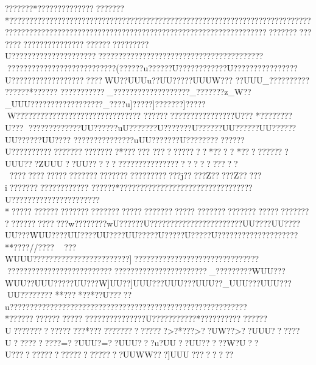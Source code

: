 {{{{{{{{{{{{{{{{{{{{{{{{{{{{{{{{{{{{{{{{{{{{{{{{{{{{{{{{{{{{{{{{{{{{{{{{{{{{{{{{{{{{{{{{{{{{{{{{{{{{{{{{{{{{{{{{{{{{{{{{{{{{{{{{{{{{{{{{{{{{{{{{{{{{{{{{{{{{{{{{{{{{{{{{{{{{{{{{{{{{{{{{{{{{{{{{{{{{{{{{{{{{{{{{{{{{{{{{{{{{{{{{{{{{{{{{{{{{{{{{{{{{{{{{{{{{{{{{{{{{{{{{{{{{{{{{{{{{{{{{{{{{{{{{{{{{{{{{{{{{{{{{{{{{{{{{{{{{{{{{{{{{{{{{{{{{{{{{{{{{{{{{{{{{{{{{{{{{{{{{{{{{{{{{{{{{{{{{{{{{{{{{{{{{{{{{{{{{{{{{{{{{{{{{{{{{{{{{{{{{{{{{{{{{{{{{{{{{{{{{{{{{{{{{{{{{{{{{{{{{{{{{{{{{{{{{{{{{{{{{{{{{{{{{{{{{{{{{{{{{{{{{{{{{{{{{{{{{{{{{{{{{{{{{{{{{{{{{{{{{{{{{{{{{{{{{{{{{{{{{{{{{{{{{{{{{{{{{{{{{{{{{{{{{{{{{{{{{{{{{{{{{{{{{{{{{{{{{{{{{{{{{{{{{{???????*?????????????????????*????????????????????????????????????????????????????????????????????????????????????????????????????????????????????????????????????????????????????????????????????????????????????????U???????????????????????????? ?????????????????????????????????????????????????????????????(??????u??????U????????????U????? ???????????U??????????????????????WU??UUUu??UU?????UUUW???    ??UUU_??????????
??????*??????   
???????????_???????????????????_??  ?????z_W??_UUU??????????????????_????u]?????]???????]?????W???????????????????????????????
??????????????????????U???
*????????U???
??????   ???????UU??????uU???????U???????U??????UU??????UU??????UU??????UU???? 
???????????????uUU???????U??????????????U?????????????????????????*?????? ???????????*????
*??????????UUU???ZUUU??UU????    ??    ????????????????    ??    ???? ??
 ????  ????  ????? ??????????????????????????j?????Z?????Z?????i???????????????????  ??????* ????? ??????? ??????? ??????????????U??????? ???????????????*??????????? ???????????????????  ????????????????????????????????????????????????????w????????wU??????U???????????????????????UU????UU????UU???WUU????UU????UU????UU?????U?????U?????U????????????????????**????//????
???WUUU????????????????????????]??????????????????    ????????????????? ???????????????????????????????? ?????????????_?????????WUU???WUU??}UUU?????UU???W]UU??]UUU???UUU???UUU??_UUU???UUU???UU????????
**???  *??*??U?????u???????????????????????????????????????????????????????????*???????????? ?????  
???????????????U???? ??????? *????????????????U????????????????*?????????????????>?*???>??UW??>??UUU??????U??????????=??UUU?=??UUU???u?UU??UU?????W?U??U???????????????????????UUWW???]UUU???   ??    ???
}}}}}}}}}}}}}}}}}}}}}}}}}}}}}}}}}}}}}}}}}}}}}}}}}}}}}}}}}}}}}}}}}}}}}}}}}}}}}}}}}}}}}}}}}}}}}}}}}}}}}}}}}}}}}}}}}}}}}}}}}}}}}}}}}}}}}}}}}}}}}}}}}}}}}}}}}}}}}}}}}}}}}}}}}}}}}}}}}}}}}}}}}}}}}}}}}}}}}}}}}}}}}}}}}}}}}}}}}}}}}}}}}}}}}}}}}}}}}}}}}}}}}}}}}}}}}}}}}}}}}}}}}}}}}}}}}}}}}}}}}}}}}}}}}}}}}}}}}}}}}}}}}}}}}}}}}}}}}}}}}}}}}}}}}}}}}}}}}}}}}}}}}}}}}}}}}}}}}}}}}}}}}}}}}}}}}}}}}}}}}}}}}}}}}}}}}}}}}}}}}}}}}}}}}}}}}}}}}}}}}}}}}}}}}}}}}}}}}}}}}}}}}}}}}}}}}}}}}}}}}}}}}}}}}}}}}}}}}}}}}}}}}}}}}}}}}}}}}}}}}}}}}}}}}}}}}}}}}}}}}}}}}}}}}}}}}}}}}}}}}}}}}}}}}}}}}}}}}}}}}}}}}}}}}}}}}}}}}}}}}}}}}}}}}}}}}}}}}}}}}}}}}}}}}}}}}}}}}}}}}}}}}}}}
